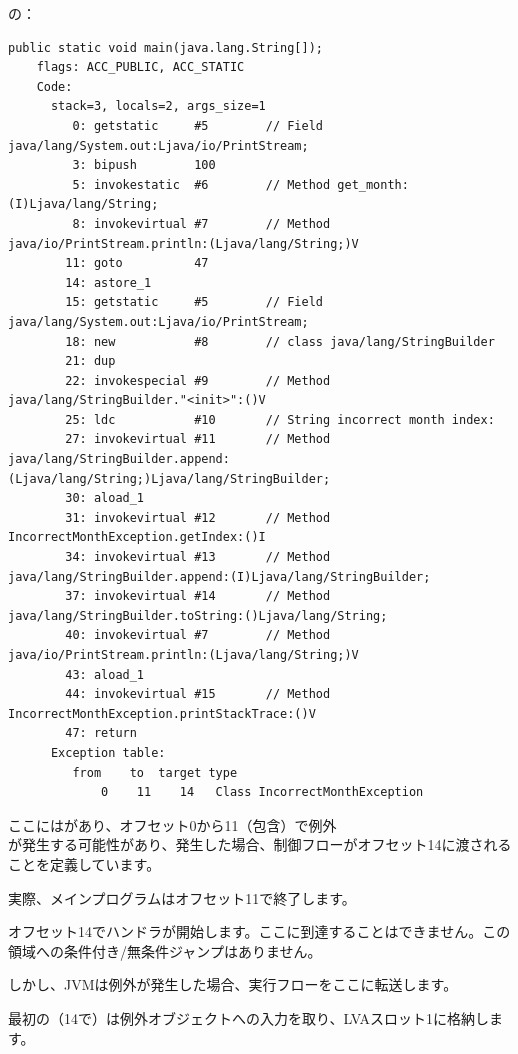 の\main：

\begin{lstlisting}[caption=Month2.class]
  public static void main(java.lang.String[]);
    flags: ACC_PUBLIC, ACC_STATIC
    Code:
      stack=3, locals=2, args_size=1
         0: getstatic     #5        // Field java/lang/System.out:Ljava/io/PrintStream;
         3: bipush        100
         5: invokestatic  #6        // Method get_month:(I)Ljava/lang/String;
         8: invokevirtual #7        // Method java/io/PrintStream.println:(Ljava/lang/String;)V
        11: goto          47
        14: astore_1      
        15: getstatic     #5        // Field java/lang/System.out:Ljava/io/PrintStream;
        18: new           #8        // class java/lang/StringBuilder
        21: dup           
        22: invokespecial #9        // Method java/lang/StringBuilder."<init>":()V
        25: ldc           #10       // String incorrect month index: 
        27: invokevirtual #11       // Method java/lang/StringBuilder.append:(Ljava/lang/String;)Ljava/lang/StringBuilder;
        30: aload_1       
        31: invokevirtual #12       // Method IncorrectMonthException.getIndex:()I
        34: invokevirtual #13       // Method java/lang/StringBuilder.append:(I)Ljava/lang/StringBuilder;
        37: invokevirtual #14       // Method java/lang/StringBuilder.toString:()Ljava/lang/String;
        40: invokevirtual #7        // Method java/io/PrintStream.println:(Ljava/lang/String;)V
        43: aload_1       
        44: invokevirtual #15       // Method IncorrectMonthException.printStackTrace:()V
        47: return        
      Exception table:
         from    to  target type
             0    11    14   Class IncorrectMonthException
\end{lstlisting}

ここにはがあり、オフセット0から11（包含）で例外\\
が発生する可能性があり、発生した場合、制御フローがオフセット14に渡されることを定義しています。

実際、メインプログラムはオフセット11で終了します。

オフセット14でハンドラが開始します。ここに到達することはできません。この領域への条件付き/無条件ジャンプはありません。

しかし、\ac{JVM}は例外が発生した場合、実行フローをここに転送します。

最初の（14で）は例外オブジェクトへの入力を取り、\ac{LVA}スロット1に格納します。

